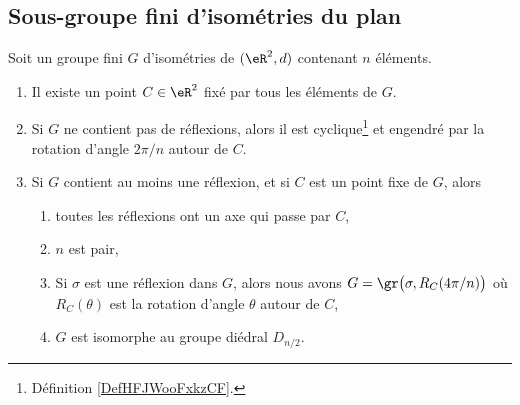\subsection{Sous-groupe fini d'isométries du plan}

\begin{theorem}       \label{THOooKDMUooUxQqbB}
    Soit un groupe fini \( G\) d'isométries de \( (\eR^2,d)\) contenant \( n \) éléments.
    \begin{enumerate}
        \item       \label{ITEMooYEONooCOMpeb}
            Il existe un point \( C\in \eR^2\) fixé par tous les éléments de \( G\).
        \item       \label{ITEMooGELWooFFAqkc}
            Si \( G\) ne contient pas de réflexions, alors il est cyclique\footnote{Définition \ref{DefHFJWooFxkzCF}.} et engendré par la rotation d'angle \( 2\pi/n\) autour de \( C\).
        \item       \label{ITEMooDHKEooFpCfmX}
            Si \( G\) contient au moins une réflexion, et si \( C\) est un point fixe de \( G\), alors
            \begin{enumerate}
                \item       \label{ITEMooGQZTooJIPPLtyf}
                    toutes les réflexions ont un axe qui passe par \( C\),
                \item       \label{ITEMooKPQRooLquSiQ}
                    \( n\) est pair,
                \item       \label{ITEMooCHSWooHpDGHf}
                    Si \( \sigma\) est une réflexion dans \( G\), alors nous avons $G=\gr\big(\sigma,R_C(4\pi/n)\big)$ où \( R_C(\theta)  \) est la rotation d'angle \( \theta\) autour de \( C\),
                \item       \label{ITEMooROUYooRghvMv}
                    \( G\) est isomorphe au groupe diédral \( D_{n/2}\).
            \end{enumerate}
    \end{enumerate}
\end{theorem}

